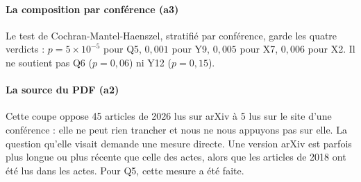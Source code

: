 \paragraph{La composition par conférence (a3)}
Le test de Cochran-Mantel-Haenszel, stratifié par conférence, garde les quatre verdicts : $p = 5 \times
10^{-5}$ pour Q5, $0{,}001$ pour Y9, $0{,}005$ pour X7, $0{,}006$ pour X2. Il ne soutient pas Q6
($p = 0{,}06$) ni Y12 ($p = 0{,}15$).

\paragraph{La source du PDF (a2)}
Cette coupe oppose 45 articles de 2026 lus sur arXiv à 5 lus sur le site d'une conférence : elle ne peut
rien trancher et nous ne nous appuyons pas sur elle. La question qu'elle visait demande une mesure directe. Une
version arXiv est parfois plus longue ou plus récente que celle des actes, alors que les articles de 2018 ont
été lus dans les actes. Pour Q5, cette mesure a été faite.

